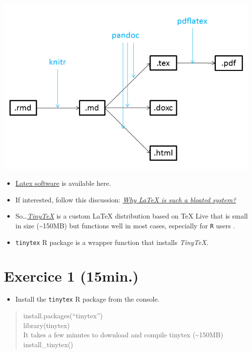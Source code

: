 \documentclass[]{article}
\providecommand{\tightlist}{%
  \setlength{\itemsep}{0pt}\setlength{\parskip}{0pt}}
\begin{document}
\includegraphics[width=5.20833in,height=\textheight]{../figures/pandoc1.png}

\begin{itemize}
\item
  \href{https://www.latex-project.org/get/}{Latex software} is available
  here.
\item
  If interested, follow this discussion:
  \href{https://ubuntuforums.org/showthread.php?t=395863}{\emph{Why
  LaTeX is such a bloated system?}}
\item
  So\ldots{}\href{https://yihui.name/tinytex/r/}{\emph{TinyTeX}} is a
  custom LaTeX distribution based on TeX Live that is small in size
  (\textasciitilde{}150MB) but functions well in most cases, especially
  for \texttt{R} users .
\item
  \texttt{tinytex} R package is a wrapper function that installs
  \emph{TinyTeX}.
\end{itemize}

\hypertarget{exercice-1-15min.}{%
\section{Exercice 1 (15min.)}\label{exercice-1-15min.}}

\begin{itemize}
\tightlist
\item
  Install the \texttt{tinytex} R package from the console.
\end{itemize}

\begin{quote}
install.packages(``tinytex'')\\
library(tinytex)\\
It takes a few minutes to download and compile tinytex
(\textasciitilde{}150MB)\\
install\_tinytex()
\end{quote}
\end{document}
